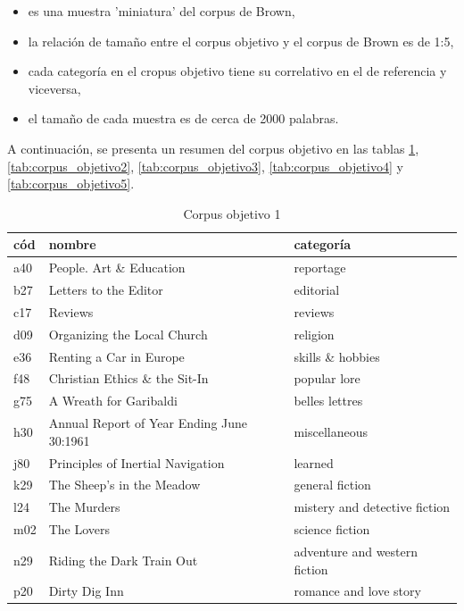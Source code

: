 \documentclass[12pt,letterpaper,twoside]{article}
\begin{document}
\begin{itemize}
\item es una muestra 'miniatura' del corpus de Brown,
\item la relación de tamaño entre el corpus objetivo y el corpus de Brown es de 1:5,
\item cada categoría en el cropus objetivo tiene su correlativo en el de referencia y viceversa,
\item el tamaño de cada muestra es de cerca de 2000 palabras.
\end{itemize}

A continuación, se presenta un resumen del corpus objetivo en las
tablas \ref{tab:corpus_objetivo1},
\ref{tab:corpus_objetivo2}, \ref{tab:corpus_objetivo3},
\ref{tab:corpus_objetivo4} y \ref{tab:corpus_objetivo5}.

\small

   \begin{table}[H]
    \centering

    \begin{tabular}{|l|l|l|}
    \hline
	cód & nombre & categoría \\ \hline
      a40 & People. Art \& Education & reportage \\ \hline
      b27 & Letters to the Editor & editorial \\ \hline
      c17 & Reviews & reviews \\ \hline
      d09 & Organizing the Local Church & religion \\ \hline
      e36 & Renting a Car in Europe & skills \& hobbies \\ \hline
      f48 & Christian Ethics \& the Sit-In & popular lore \\ \hline
      g75 & A Wreath for Garibaldi & belles lettres \\ \hline
      h30 & Annual Report of Year Ending June 30:1961 & miscellaneous \\ \hline
      j80 & Principles of Inertial Navigation & learned \\ \hline
      k29 & The Sheep's in the Meadow & general fiction \\ \hline
      l24 & The Murders & mistery and detective fiction \\ \hline
      m02 & The Lovers & science fiction \\ \hline
      n29 & Riding the Dark Train Out & adventure and western fiction \\ \hline
      p20 & Dirty Dig Inn & romance and love story \\ \hline
    \end{tabular}
\caption{Corpus objetivo 1}
\label{tab:corpus_objetivo1}
\end{table}
\end{document}
